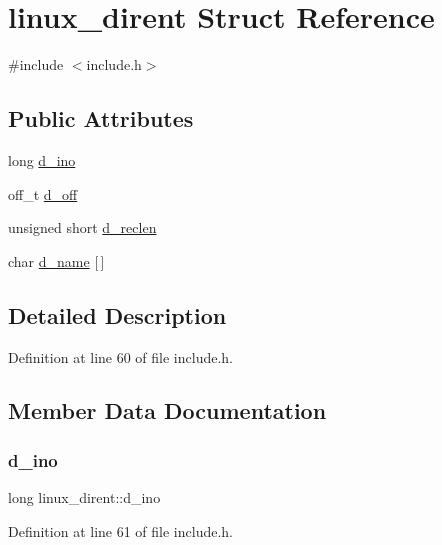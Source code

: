\hypertarget{structlinux__dirent}{}\section{linux\+\_\+dirent Struct Reference}
\label{structlinux__dirent}


{\ttfamily \#include $<$include.\+h$>$}

\subsection*{Public Attributes}
\begin{DoxyCompactItemize}
\item 
long \hyperlink{structlinux__dirent_a7ed8ec01b550ca3567776b0be32e8af8}{d\+\_\+ino}
\item 
off\+\_\+t \hyperlink{structlinux__dirent_a8c685abf351d3f31a8dd119e4a775078}{d\+\_\+off}
\item 
unsigned short \hyperlink{structlinux__dirent_a42ba867e75bb4fbf7cae374bc58ee91a}{d\+\_\+reclen}
\item 
char \hyperlink{structlinux__dirent_a7e12cde71271d11545975d19b13200fa}{d\+\_\+name} \mbox{[}$\,$\mbox{]}
\end{DoxyCompactItemize}


\subsection{Detailed Description}


Definition at line 60 of file include.\+h.



\subsection{Member Data Documentation}
\mbox{\label{structlinux__dirent_a7ed8ec01b550ca3567776b0be32e8af8}} 
\subsubsection{\texorpdfstring{d\+\_\+ino}{d\_ino}}
{\footnotesize\ttfamily long linux\+\_\+dirent\+::d\+\_\+ino}



Definition at line 61 of file include.\+h.

